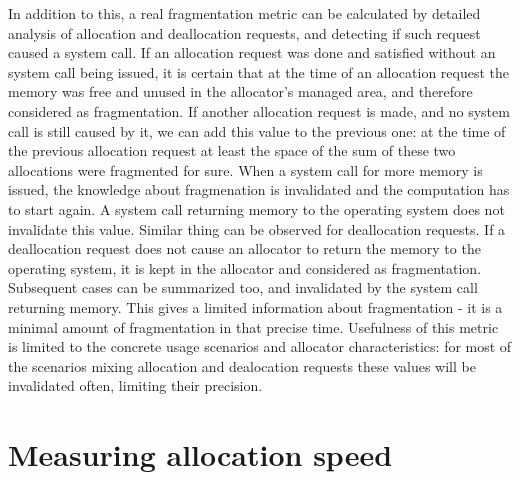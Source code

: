 In addition to this, a real fragmentation metric can be calculated by detailed analysis of allocation and deallocation requests, and detecting if such request caused a system call. If an allocation request was done and satisfied without an system call being issued, it is certain that at the time of an allocation request the memory was free and unused in the allocator's managed area, and therefore considered as fragmentation. If another allocation request is made, and no system call is still caused by it, we can add this value to the previous one: at the time of the previous allocation request at least the space of the sum of these two allocations were fragmented for sure. When a system call for more memory is issued, the knowledge about fragmenation is invalidated and the computation has to start again. A system call returning memory to the operating system does not invalidate this value. Similar thing can be observed for deallocation requests. If a deallocation request does not cause an allocator to return the memory to the operating system, it is kept in the allocator and considered as fragmentation. Subsequent cases can be summarized too, and invalidated by the system call returning memory. This gives a limited information about fragmentation - it is a minimal amount of fragmentation in that precise time. Usefulness of this metric is limited to the concrete usage scenarios and allocator characteristics: for most of the scenarios mixing allocation and dealocation requests these values will be invalidated often, limiting their precision.

\section{Measuring allocation speed}

